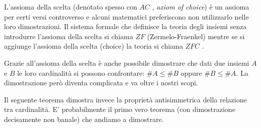 L'assioma della scelta (denotato spesso con \emph{$AC$}%
%
, \emph{axiom of choice})
è un assioma per certi versi controverso
e alcuni matematici preferiscono non utilizzarlo nelle loro dimostrazioni.
Il sistema formale che definisce la teoria degli insiemi senza 
introdurre l'assioma della scelta 
si chiama \emph{$ZF$}%
%
 (Zermelo-Fraenkel) mentre 
se si aggiunge l'assioma della scelta (choice) la teoria si chiama 
\emph{$ZFC$}%
%
.

Grazie all'assioma della scelta è anche possibile dimostrare 
che dati due insiemi $A$ e $B$ le loro cardinalità
si possono confrontare: $\#A\le \#B$ oppure 
$\#B\le \#A$. 
La dimostrazione però diventa complicata e va oltre i nostri scopi.

Il seguente teorema dimostra invece la proprietà antisimmetrica 
della relazione tra cardinalità. 
E' probabilmente il primo vero teorema 
(con dimostrazione decisamente non banale) 
che andiamo a dimostrare.

